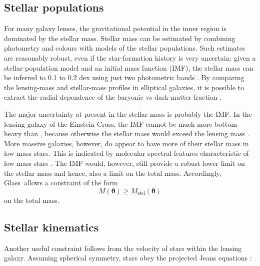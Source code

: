 \documentclass[galley,usenatbib]{mn2e}
\renewcommand{\vec}[1]{\ensuremath{\boldsymbol{#1}}}
\newcommand{\Glass}{{\sc Glass}}
\begin{document}
\subsection{Stellar populations} 

For many galaxy lenses, the gravitational potential in the inner region is
dominated by the stellar mass.  Stellar mass can be estimated by combining
photometry and colours with models of the stellar populations.  Such estimates
are reasonably robust, even if the star-formation history is very uncertain:
given a stellar-population model \citep[such as][]{2003MNRAS.344.1000B} and an
initial mass function (IMF), the stellar mass can be inferred to 0.1 to 0.2 dex
using just two photometric bands \citep[see e.g., Figure~1 in][]{2008MNRAS.383..857F}.
By comparing the lensing-mass and stellar-mass profiles in elliptical galaxies,
it is possible to extract the radial dependence of the baryonic vs dark-matter
fraction \citep{2005ApJ...623L...5F,2008MNRAS.383..857F,2011ApJ...740...97L}.

The major uncertainty at present in the stellar mass is probably the IMF.  In
the lensing galaxy of the Einstein Cross, the IMF cannot be much more
bottom-heavy than \cite{2003PASP..115..763C}, because otherwise the stellar
mass would exceed the lensing mass \cite{2010MNRAS.409L..30F}.  More massive
galaxies, however, do appear to have more of their stellar mass in low-mass
stars.  This is indicated by molecular spectral features characteristic of low
mass stars
\citep{2004ApJ...614L.101C,2012ApJ...747...69C,2013MNRAS.429L..15F}.
The \cite{2003PASP..115..763C} IMF would, however, still provide a robust
lower limit on the stellar mass and hence, also a limit on the total
mass.  Accordingly, \Glass\ allows a constraint of the form
%
\begin{equation} 
M(\vec\theta) \geq M_\mathrm{stel}(\vec\theta)
\end{equation} 
%
on the total mass.

\subsection{Stellar kinematics}\label{sec:kinematics} 

Another useful constraint follows from the velocity of stars within the lensing
galaxy. Assuming spherical symmetry, stars obey the projected Jeans equations
\citep[e.g.][]{2008gady.book.....B}: 
\end{document}
